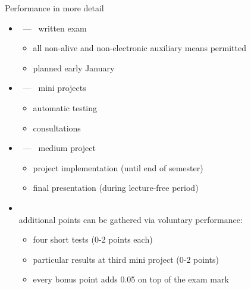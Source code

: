 \begin{frame}[c]{Performance in more detail}
  \begin{itemize}
  \item<1->  \ --- \ \alert{written exam}
    \begin{itemize}
    \item all non-alive and non-electronic auxiliary means permitted
    \item planned early January
    \end{itemize}
    \medskip
  \item<1->  \ --- \ \alert{mini projects}
    \begin{itemize}
    \item automatic testing
    \item consultations
    \end{itemize}
    \medskip
  \item<2->  \ --- \ \alert{medium project}
    \begin{itemize}
    \item project implementation  (until end of semester)
    \item final presentation (during lecture-free period)
    \end{itemize}
    \medskip
  \item<3-> \\
    additional points can be gathered via voluntary performance:
    \begin{itemize}
    \item four short tests  (0-2 points each)
    \item particular results at third mini project (0-2 points)
    \item every bonus point adds 0.05 on top of the exam mark
    \end{itemize}
  \end{itemize}
\end{frame}
%
